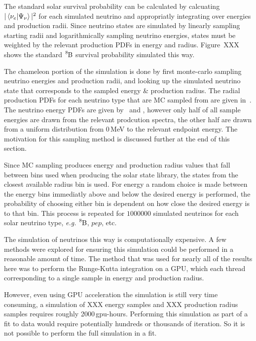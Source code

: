 The standard solar survival probability can be calculated by calcuating
$|\bra{\nu_{e}}\ket{\Psi_{\nu}}|^{2}$ for each simulated neutrino and appropriatly
integrating over energies and production radii.
Since neutrino states are simulated by linearly sampling starting radii and logarithmically
sampling neutrino energies, states must be weighted by the relevant production
PDFs in energy and radius.
Figure~{XXX} shows the standard $\ce{^{8}B}$ survival probability simulated
this way.

The chameleon portion of the simulation is done by first monte-carlo sampling
neutrino energies and production radii, and looking up the simulated
neutrino state that corresponds to the sampled energy \& production radius.
The radial production PDFs for each neutrino type that are MC sampled from 
are given in~\cite{XXXradialproduction?}.
The neutrino energy PDFs are given by~\cite{BS05OP} and \cite{Winters},
however only half of all sample energies are drawn from the relevant prodcution
spectra, the other half are drawn from a uniform distribution from
0\,MeV to the relevant endpoint energy.
The motivation for this sampling method is discussed further at the end of
this section.

Since MC sampling produces energy and production radius values that fall
between bins used when producing the solar state library, the states
from the closest available radius bin is used. For energy
a random choice is made between the energy bins immediatly above and below
the desired energy is performed, the probability of choosing either bin
is dependent on how close the desired energy is to that bin.
This process is repeated for $1000000$ simulated neutrinos for each solar
neutrino type, \textit{e.g.} $\ce{^{8}B}$, $pep$, etc.

The simulation of neutrinos this way is computationally expensive. A few methods
were explored for ensuring this simulation could be performed in a reasonable
amount of time. The method that was used for nearly all of the results here was
to perform the Runge-Kutta integration on a GPU, which each thread corresponding
to a single sample in energy and production radius.

However, even using GPU acceleration the simulation is still very time consuming,
a simulation of XXX energy samples and XXX production radius samples requires
roughly 2000\,gpu-hours. Performing this simulation as part of a fit to data would
require potentially hundreds or thousands of iteration. So it is not possible to
perform the full simulation in a fit.

